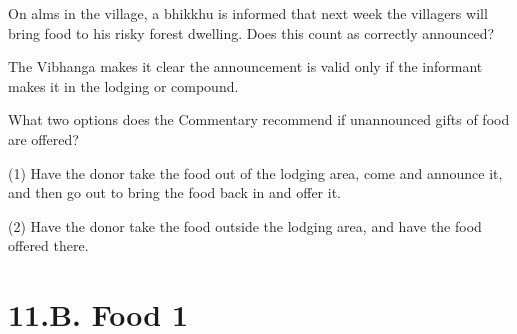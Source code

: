\bigskip

On alms in the village, a bhikkhu is informed that next week the villagers will
bring food to his risky forest dwelling. Does this count as correctly announced?

\begin{solution}
  The Vibhanga makes it clear the announcement is valid only if the informant
  makes it in the lodging or compound.
\end{solution}

\bigskip

What two options does the Commentary recommend if unannounced gifts of food are offered?

\begin{solution}
  (1) Have the donor take the food out of the lodging area, come and announce it,
  and then go out to bring the food back in and offer it.
 
  (2) Have the donor take the food outside the lodging area, and have the food
  offered there.
\end{solution}

\chapter{11.B. Food 1}
\renewcommand*{\theChapterTitle}{11.B. Food 1}
